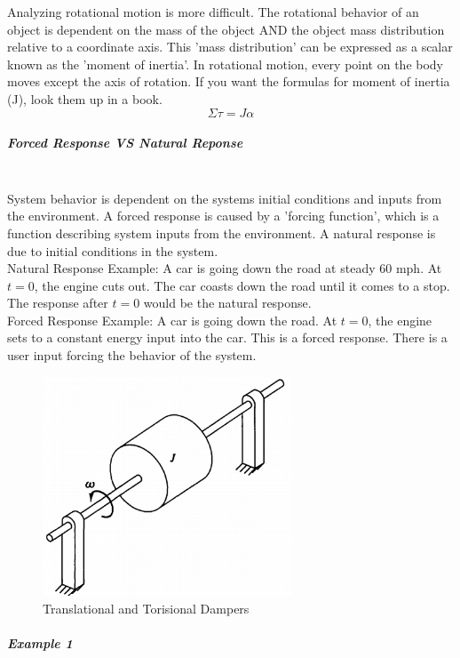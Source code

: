 \documentclass[paper=a4, fontsize=11pt]{scrartcl} %
\numberwithin{equation}{section} %
\numberwithin{figure}{section} %
\numberwithin{table}{section} %
\begin{document}
Analyzing rotational motion is more difficult. The rotational behavior of an object is dependent on the mass of the object AND the object mass distribution relative to a coordinate axis. This 'mass distribution' can be expressed as a scalar known as the 'moment of inertia'. In rotational motion, every point on the body moves except the axis of rotation. If you want the formulas for moment of inertia (J), look them up in a book. \\

$$\Sigma \tau = J \alpha$$

\subparagraph{Forced Response VS Natural Reponse}~ \\
System behavior is dependent on the systems initial conditions and inputs from the environment. A forced response is caused by a 'forcing function', which is a function describing system inputs from the environment. A natural response is due to initial conditions in the system. \\
Natural Response Example: A car is going down the road at steady 60 mph. At $t=0$, the engine cuts out. The car coasts down the road until it comes to a stop. The response after $t=0$ would be the natural response. \\
Forced Response Example: A car is going down the road. At $t=0$, the engine sets to a constant energy input into the car. This is a forced response. There is a user input forcing the behavior of the system. \\

\begin{figure}
\begin{center}
  \includegraphics[width=20em]{Example_1}
  \caption{Translational and Torisional Dampers}
  \label{fig:boat1}
\end{center}
\end{figure}

\subparagraph{Example 1}~ \\
\end{document}
